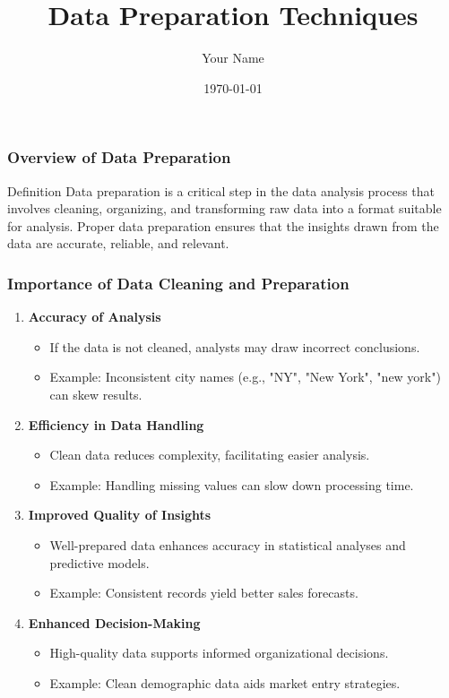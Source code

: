 \documentclass{beamer}
\title{Data Preparation Techniques}
\author{Your Name}
\institute{Your Institution}
\date{\today}
\begin{document}
\frame{\titlepage}

\begin{frame}[fragile]
    \titlepage
\end{frame}

\begin{frame}[fragile]
    \frametitle{Overview of Data Preparation}
    \begin{block}{Definition}
        Data preparation is a critical step in the data analysis process that involves cleaning, organizing, and transforming raw data into a format suitable for analysis. Proper data preparation ensures that the insights drawn from the data are accurate, reliable, and relevant.
    \end{block}
\end{frame}

\begin{frame}[fragile]
    \frametitle{Importance of Data Cleaning and Preparation}
    \begin{enumerate}
        \item \textbf{Accuracy of Analysis}
        \begin{itemize}
            \item If the data is not cleaned, analysts may draw incorrect conclusions.
            \item Example: Inconsistent city names (e.g., "NY", "New York", "new york") can skew results.
        \end{itemize}
        
        \item \textbf{Efficiency in Data Handling}
        \begin{itemize}
            \item Clean data reduces complexity, facilitating easier analysis.
            \item Example: Handling missing values can slow down processing time.
        \end{itemize}
        
        \item \textbf{Improved Quality of Insights}
        \begin{itemize}
            \item Well-prepared data enhances accuracy in statistical analyses and predictive models.
            \item Example: Consistent records yield better sales forecasts.
        \end{itemize}
        
        \item \textbf{Enhanced Decision-Making}
        \begin{itemize}
            \item High-quality data supports informed organizational decisions.
            \item Example: Clean demographic data aids market entry strategies.
        \end{itemize}
    \end{enumerate}
\end{frame}
\end{document}
